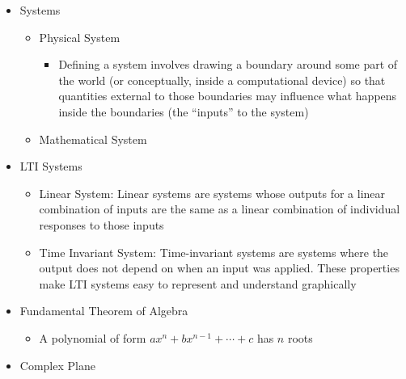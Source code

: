 \begin{itemize}
\begin{itemize}
    \end{itemize}

  \item Systems

    \begin{itemize}

      \item Physical System

        \begin{itemize}

          \item Defining a system involves drawing a boundary around some part of the world (or conceptually, inside a computational device) so that quantities external to those boundaries may influence what happens inside the boundaries (the ``inputs'' to the system)

        \end{itemize}

      \item Mathematical System

    \end{itemize}

  \item LTI Systems

    \begin{itemize}

      \item Linear System: Linear systems are systems whose outputs for a linear combination of inputs are the same as a linear combination of individual responses to those inputs

      \item Time Invariant System: Time-invariant systems are systems where the output does not depend on when an input was applied. These properties make LTI systems easy to represent and understand graphically

    \end{itemize}

  \item Fundamental Theorem of Algebra

    \begin{itemize}

      \item A polynomial of form $ax^n+bx^{n-1}+\cdots+c$ has $n$ roots

    \end{itemize}

  \item Complex Plane


\end{itemize}
